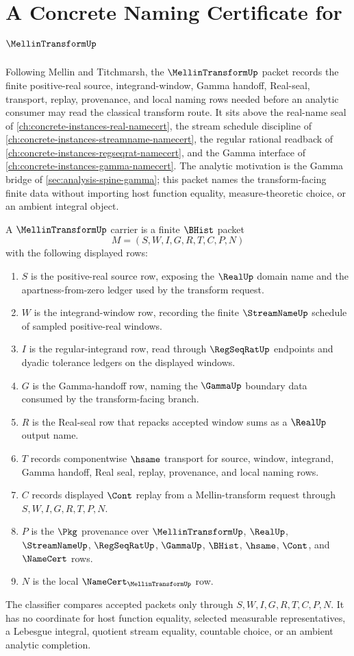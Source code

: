 \chapter{A Concrete Naming Certificate for $\MellinTransformUp$}
\label{ch:concrete-instances-mellin-transform-namecert}

Following Mellin and Titchmarsh, the $\MellinTransformUp$ packet records the finite positive-real source, integrand-window, Gamma handoff, Real-seal, transport, replay, provenance, and local naming rows needed before an analytic consumer may read the classical transform route. It sits above the real-name seal of \autoref{ch:concrete-instances-real-namecert}, the stream schedule discipline of \autoref{ch:concrete-instances-streamname-namecert}, the regular rational readback of \autoref{ch:concrete-instances-regseqrat-namecert}, and the Gamma interface of \autoref{ch:concrete-instances-gamma-namecert}. The analytic motivation is the Gamma bridge of \autoref{sec:analysis-spine-gamma}; this packet names the transform-facing finite data without importing host function equality, measure-theoretic choice, or an ambient integral object.

\begin{definition}
\label{def:mellin-transform-carrier}
A $\MellinTransformUp$ carrier is a finite $\BHist$ packet
$$
M=(S,W,I,G,R,T,C,P,N)
$$
with the following displayed rows:
\begin{enumerate}
\item $S$ is the positive-real source row, exposing the $\RealUp$ domain name and the apartness-from-zero ledger used by the transform request.
\item $W$ is the integrand-window row, recording the finite $\StreamNameUp$ schedule of sampled positive-real windows.
\item $I$ is the regular-integrand row, read through $\RegSeqRatUp$ endpoints and dyadic tolerance ledgers on the displayed windows.
\item $G$ is the Gamma-handoff row, naming the $\GammaUp$ boundary data consumed by the transform-facing branch.
\item $R$ is the Real-seal row that repacks accepted window sums as a $\RealUp$ output name.
\item $T$ records componentwise $\hsame$ transport for source, window, integrand, Gamma handoff, Real seal, replay, provenance, and local naming rows.
\item $C$ records displayed $\Cont$ replay from a Mellin-transform request through $S,W,I,G,R,T,P,N$.
\item $P$ is the $\Pkg$ provenance over $\MellinTransformUp$, $\RealUp$, $\StreamNameUp$, $\RegSeqRatUp$, $\GammaUp$, $\BHist$, $\hsame$, $\Cont$, and $\NameCert$ rows.
\item $N$ is the local $\NameCert_{\MellinTransformUp}$ row.
\end{enumerate}
The classifier compares accepted packets only through $S,W,I,G,R,T,C,P,N$. It has no coordinate for host function equality, selected measurable representatives, a Lebesgue integral, quotient stream equality, countable choice, or an ambient analytic completion.
\end{definition}

